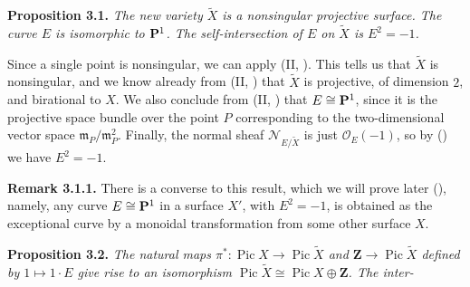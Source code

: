 {\medskip
\noindent\hypertarget{result-V-3.1}{}\textbf{Proposition 3.1.} \emph{The new variety $\widetilde X$ is a nonsingular projective surface. The curve $E$ is isomorphic to $\mathbf{P}^1$. The self-intersection of $E$ on $\widetilde X$ is $E^2=-1$.}

\Proof Since a single point is nonsingular, we can apply (II, ). This tells us that $\widetilde X$ is nonsingular, and we know already from (II, ) that $\widetilde X$ is projective, of dimension $2$, and birational to $X$. We also conclude from (II, ) that $E\cong\mathbf{P}^1$, since it is the projective space bundle over the point $P$ corresponding to the two-dimensional vector space $\mathfrak m_P/\mathfrak m_P^2$. Finally, the normal sheaf $\mathcal N_{E/\widetilde X}$ is just $\mathcal O_E(-1)$, so by () we have $E^2=-1$.

\medskip
\noindent\hypertarget{result-V-3.1.1}{}\textbf{Remark 3.1.1.} There is a converse to this result, which we will prove later (), namely, any curve $E\cong\mathbf{P}^1$ in a surface $X'$, with $E^2=-1$, is obtained as the exceptional curve by a monoidal transformation from some other surface $X$.

\medskip
\noindent\hypertarget{result-V-3.2}{}\textbf{Proposition 3.2.} \emph{The natural maps $\pi^*\colon\operatorname{Pic}X\to\operatorname{Pic}\widetilde X$ and $\mathbf Z\to\operatorname{Pic}\widetilde X$ defined by $1\mapsto1\cdot E$ give rise to an isomorphism $\operatorname{Pic}\widetilde X\cong\operatorname{Pic}X\oplus\mathbf Z$. The inter-}
}
